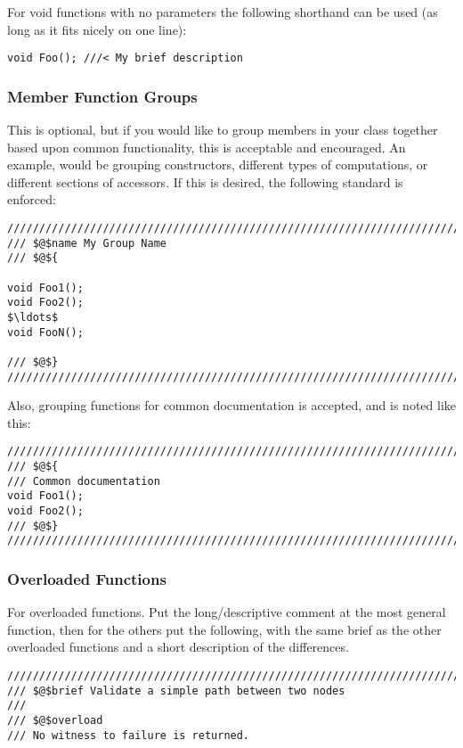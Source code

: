 \documentclass[12pt]{article}
\begin{document}
For void functions with no parameters the following shorthand can be used (as
long as it fits nicely on one line):
\begin{lstlisting}[mathescape]
void Foo(); ///< My brief description
\end{lstlisting}


\subsubsection{Member Function Groups}

This is optional, but if you would like to group members in your class together
based upon common functionality, this is acceptable and encouraged. An example,
would be grouping constructors, different types of computations, or different
sections of accessors. If this is desired, the following standard is enforced:

\begin{lstlisting}[mathescape]
///////////////////////////////////////////////////////////////////////////////
/// $@$name My Group Name
/// $@${

void Foo1();
void Foo2();
$\ldots$
void FooN();

/// $@$}
///////////////////////////////////////////////////////////////////////////////
\end{lstlisting}

Also, grouping functions for common documentation is accepted, and is noted like
this:

\begin{lstlisting}[mathescape]
///////////////////////////////////////////////////////////////////////////////
/// $@${
/// Common documentation
void Foo1();
void Foo2();
/// $@$}
///////////////////////////////////////////////////////////////////////////////
\end{lstlisting}

\subsubsection{Overloaded Functions}

For overloaded functions. Put the long/descriptive comment at the most general
function, then for the others put the following, with the same brief as the
other overloaded functions and a short description of the differences.

\begin{lstlisting}[mathescape]
///////////////////////////////////////////////////////////////////////////////
/// $@$brief Validate a simple path between two nodes
///
/// $@$overload
/// No witness to failure is returned.
\end{lstlisting}
\end{document}
